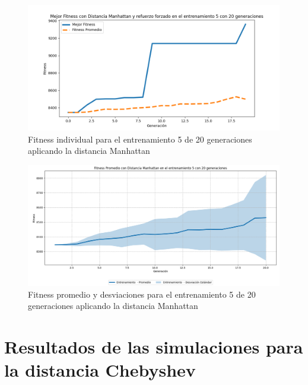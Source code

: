 \documentclass[conference]{IEEEtran}
\begin{document}
\begin{figure}[H]
    \centering
    \includegraphics[width=0.9 \linewidth]{Manhattan/Fitness_individual_20Gen/Fitness_5_Manh_20Gen.png}
    \caption{Fitness individual para el entrenamiento 5 de 20 generaciones aplicando la distancia Manhattan}
    \label{fig:manhattan_5_20}
\end{figure}
\begin{figure}[H]
    \centering
    \includegraphics[width=0.9 \linewidth]{Manhattan/Fitness_individual_20Gen/Fitness_5_Manh_20Gen_Sombra.png}
    \caption{Fitness promedio y desviaciones para el entrenamiento 5 de 20 generaciones aplicando la distancia Manhattan}
    \label{fig:manhattan_5_20_sombra}
\end{figure}

\section{Resultados de las simulaciones para la distancia Chebyshev}
\end{document}
